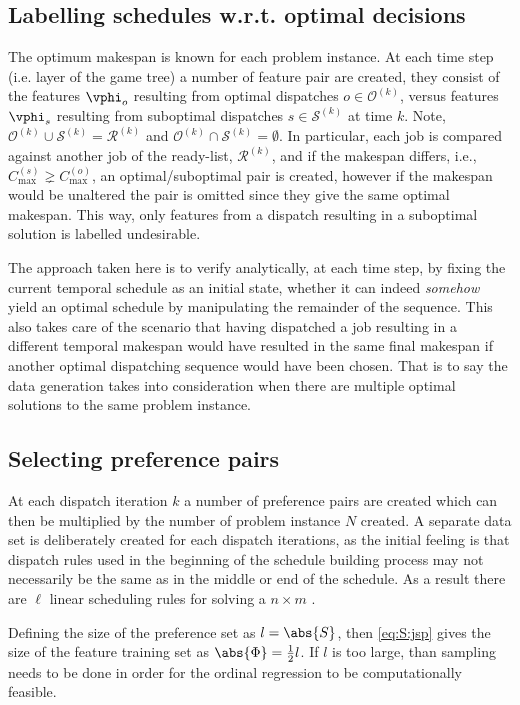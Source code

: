 \subsection{Labelling schedules w.r.t. optimal decisions}
The optimum makespan is known for each problem instance. 
At each time step (i.e. layer of the game tree) a number of feature pair are created, they consist of the features $\vphi_o$ resulting from optimal dispatches $o\in\mathcal{O}^{(k)}$, versus features $\vphi_s$ resulting from suboptimal dispatches $s\in\mathcal{S}^{(k)}$ at time $k$. Note, $\mathcal{O}^{(k)}\cup\mathcal{S}^{(k)}=\mathcal{R}^{(k)}$ and $\mathcal{O}^{(k)}\cap\mathcal{S}^{(k)}=\emptyset$.
In particular, each job is compared against another job of the ready-list, $\mathcal{R}^{(k)}$, and if the makespan differs, i.e., $C_{\max}^{(s)}\gneq C_{\max}^{(o)}$, an optimal/suboptimal pair is created, however if the makespan would be unaltered the pair is omitted since they give the same optimal makespan. This way, only features from a dispatch resulting in a suboptimal solution is labelled undesirable.

The approach taken here is to verify analytically, at each time step, by fixing the current temporal schedule as an initial state, whether it can indeed \emph{somehow} yield an optimal schedule by manipulating the remainder of the sequence. This also takes care of the scenario that having dispatched a job resulting in a different temporal makespan would have resulted in the same final makespan if another optimal dispatching sequence would have been chosen. That is to say the data generation takes into consideration when there are multiple optimal solutions to the same problem instance. 

\subsection{Selecting preference pairs}\label{sec:S:strategies}
At each dispatch iteration $k$ a number of preference pairs are created which can then be multiplied by the number of problem instance $N$ created. A separate data set is deliberately created for each dispatch iterations, as the initial feeling is that dispatch rules used in the beginning of the schedule building process may not necessarily be the same as in the middle or end of the schedule. As a result there are $\ell$ linear scheduling rules for solving a $n \times m$ \jsp.

Defining the size of the preference set as $l=\abs{S}$, then \cref{eq:S:jsp} gives the size of the feature training set as $\abs{\Phi}=\frac{1}{2}l$. If $l$ is too large, than sampling needs to be done in order for the ordinal regression to be computationally feasible.

